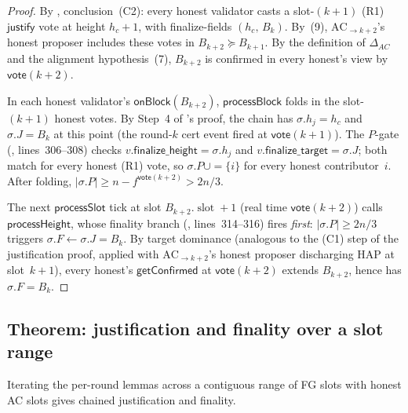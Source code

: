 \documentclass{article}
\newcommand{\slot}[0]{\ensuremath{\operatorname{\mathrm{slot}}}}
\newcommand{\just}{\ensuremath{\mathsf{justify}}\xspace}
\newcommand{\finalizeHeight}{\mathsf{finalize\_height}}
\newcommand{\finalizeTarget}{\mathsf{finalize\_target}}
\newcommand{\vote}{\mathsf{vote}}
\newcommand{\processSlot}{\textsf{processSlot}\xspace}
\newcommand{\processBlock}{\textsf{processBlock}\xspace}
\newcommand{\processHeight}{\textsf{processHeight}\xspace}
\newcommand{\onBlock}{\textsf{onBlock}\xspace}
\newcommand{\getConfirmed}{\textsf{getConfirmed}\xspace}
\theoremstyle{plain}
\theoremstyle{definition}
\theoremstyle{remark}
\begin{document}
\begin{proof}
By , conclusion~\mbox{(C2)}: every honest validator casts a slot-$(k+1)$ \mbox{(R1)} \just vote at height $h_c + 1$, with finalize-fields $(h_c,\, B_k)$. By~(9), $\mathrm{AC}_{\to k+2}$'s honest proposer includes these votes in $B_{k+2} \succeq B_{k+1}$. By the definition of $\Delta_{AC}$ and the alignment hypothesis~(7), $B_{k+2}$ is confirmed in every honest's view by $\vote(k+2)$.

In each honest validator's $\onBlock(B_{k+2})$, $\processBlock$ folds in the slot-$(k+1)$ honest votes. By Step~4 of 's proof, the chain has $\sigma.h_j = h_c$ and $\sigma.J = B_k$ at this point (the round-$k$ cert event fired at $\vote(k+1)$). The $P$-gate (, lines~306--308) checks $v.\finalizeHeight = \sigma.h_j$ and $v.\finalizeTarget = \sigma.J$; both match for every honest \mbox{(R1)} vote, so $\sigma.P \cup= \{i\}$ for every honest contributor~$i$. After folding, $|\sigma.P| \geq n - f^{\vote(k+2)} > 2n/3$.

The next $\processSlot$ tick at slot $B_{k+2}.\slot + 1$ (real time $\vote(k+2)$) calls $\processHeight$, whose finality branch (, lines~314--316) fires \emph{first}: $|\sigma.P| \geq 2n/3$ triggers $\sigma.F \gets \sigma.J = B_k$. By target dominance (analogous to the (C1) step of the justification proof, applied with $\mathrm{AC}_{\to k+2}$'s honest proposer discharging HAP at slot~$k+1$), every honest's $\getConfirmed$ at $\vote(k+2)$ extends $B_{k+2}$, hence has $\sigma.F = B_k$.
\end{proof}

\subsection{Theorem: justification and finality over a slot range}\label{rev:subsec:per-round-theorem}

Iterating the per-round lemmas across a contiguous range of FG slots with honest AC slots gives chained justification and finality.
\end{document}
